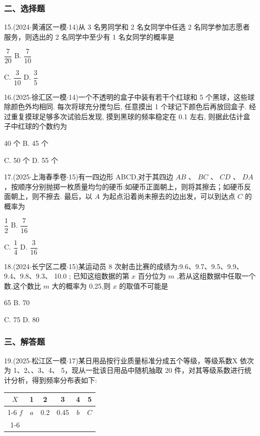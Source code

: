 \subsubsection*{二、选择题}

15.(2024$\cdot$黄浦区一模$\cdot$14)从 3 名男同学和 2 名女同学中任选 2 名同学参加志愿者服务，则选出的 2 名同学中至少有 1 名女同学的概率是 \dotfill{(\kh{})}

\xx{}{}{}{}$\dfrac{7}{20}$ B. $\dfrac{7}{10}$

C. $\dfrac{3}{10}$ D. $\dfrac{3}{5}$

16.(2025$\cdot$徐汇区一模$\cdot$14)一个不透明的盒子中装有若干个红球和 5 个黑球，这些球除颜色外均相同. 每次将球充分搅匀后, 任意摸出 1 个球记下颜色后再放回盒子. 经过重复摸球足够多次试验后发现, 摸到黑球的频率稳定在 0.1 左右, 则据此估计盒子中红球的个数约为 \dotfill{(\kh{})}

\xx{}{}{}{}40 个 B. 45 个

C. 50 个 D. 55 个

17.(2025$\cdot$上海春季卷$\cdot$15)有一四边形 ABCD,对于其四边 ${AB}$ 、 ${BC}$ 、 ${CD}$ 、 ${DA}$ ，按顺序分别抛掷一枚质量均匀的硬币:如硬币正面朝上，则将其擦去；如硬币反面朝上，则不擦去. 最后，以 $A$ 为起点沿着尚未擦去的边出发，可以到达点 $C$ 的概率为 \dotfill{(\kh{})}

\xx{}{}{}{}$\dfrac{1}{2}$ B. $\dfrac{7}{16}$

C. $\dfrac{1}{4}$ D. $\dfrac{3}{16}$

18.(2024$\cdot$长宁区二模$\cdot$15)某运动员 8 次射击比赛的成绩为:9.6、9.7、9.5、9.9、9.4、9.8、9.3、 10.0 ; 已知这组数据的第 $x$ 百分位为 $m$ ,若从这组数据中任取一个数,这个数比 $m$ 大的概率为 0.25,则 $x$ 的取值不可能是 \dotfill{(\kh{})}

\xx{}{}{}{}65 B. 70

C. 75 D. 80

\subsubsection*{三、解答题}

19.(2025$\cdot$松江区一模$\cdot$17)某日用品按行业质量标准分成五个等级，等级系数X 依次为 1、2、、3、4、 5，现从一批该日用品中随机抽取 20 件，对其等级系数进行统计分析，得到频率分布表如下:

\begin{center}

\begin{tabular}{|c|c|c|c|c|c|}
\hline
$X$ & 1 & 2 & 3 & 4 & 5 \\
\cline{1-6}
$f$ & $a$ & 0.2 & 0.45 & $b$ & $C$ \\
\cline{1-6}
\hline
\end{tabular}
\end{center}

